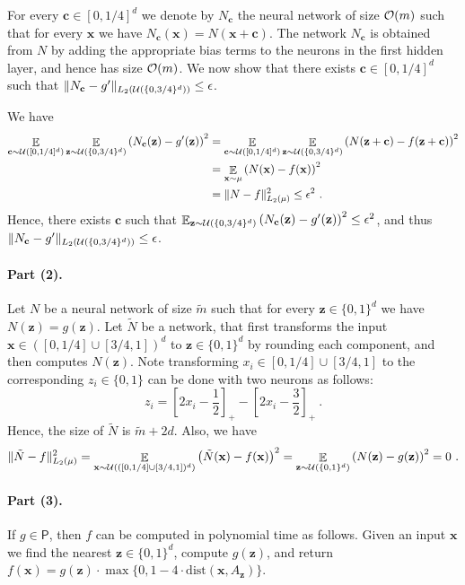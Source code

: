 \documentclass[11pt]{article}
\newcommand{\bx}{\mathbf{x}}
\newcommand{\bz}{\mathbf{z}}
\newcommand{\bc}{\mathbf{c}}
\newcommand{\co}{{\cal O}}
\newcommand{\cu}{{\cal U}}
\DeclareMathOperator*{\E}{\mathbb{E}}
\newcommand{\snorm}[1]{\|#1\|} %
\newcommand{\Ptime}{\textsf{P}}
\begin{document}
For every $\bc \in [0,1/4]^d$ we denote by $N_\bc$ the neural network of size $\co(m)$ such that for every $\bx$ we have $N_\bc(\bx)=N(\bx+\bc)$. The network $N_\bc$ is obtained from $N$ by adding the appropriate bias terms to the neurons in the first hidden layer, and hence has size $\co(m)$. We now show that there exists $\bc \in [0,1/4]^d$ such that 
$\snorm{N_\bc - g'}_{L_2(\cu(\{0,3/4\}^d))} \leq \epsilon$.

We have 
\begin{align*}
	\E_{\bc \sim \cu([0,1/4]^d)} \E_{\bz \sim \cu(\{0,3/4\}^d)} \left(N_\bc(\bz)-g'(\bz)\right)^2 
	&= \E_{\bc \sim \cu([0,1/4]^d)} \E_{\bz \sim \cu(\{0,3/4\}^d)} \left(N(\bz+\bc)-f(\bz+\bc)\right)^2 
	\\
	&= \E_{\bx \sim \mu} \left(N(\bx)-f(\bx)\right)^2 
	\\
	&=\snorm{N-f}_{L_2(\mu)}^2
	\leq \epsilon^2~.
\end{align*}
Hence, there exists $\bc$ such that 
$\E_{\bz \sim \cu(\{0,3/4\}^d)} \left(N_\bc(\bz)-g'(\bz)\right)^2 \leq \epsilon^2$,
and thus $\snorm{N_\bc - g'}_{L_2(\cu(\{0,3/4\}^d))} \leq \epsilon$.

\paragraph{Part (2).}
Let $N$ be a neural network of size $\tilde{m}$ such that for every $\bz \in \{0,1\}^d$ we have $N(\bz)=g(\bz)$. Let $\tilde{N}$ be a network, that first transforms the input $\bx \in ([0,1/4] \cup [3/4,1])^d$ to $\bz \in \{0,1\}^d$ by rounding each component, and then computes $N(\bz)$.
Note transforming $x_i \in [0,1/4] \cup [3/4,1]$ to the corresponding $z_i \in \{0,1\}$ can be done with two neurons as follows:
\[
z_i	= \left[2x_i-\frac{1}{2}\right]_+ - \left[2x_i-\frac{3}{2}\right]_+~.
\]
Hence, the size of $\tilde{N}$ is $\tilde{m}+2d$. Also, we have
\[
\snorm{\tilde{N}-f}_{L_2(\mu)} ^2
= \E_{\bx \sim \cu(([0,1/4] \cup [3/4,1])^d)}\left(\tilde{N}(\bx)-f(\bx)\right)^2
= \E_{\bz \sim \cu(\{0,1\}^d)}\left(N(\bz) - g(\bz) \right)^2
= 0~.
\]

\paragraph{Part (3).}
If $g \in \Ptime$, then $f$ can be computed in polynomial time as follows. Given an input $\bx$ we find the nearest $\bz \in \{0,1\}^d$, compute $g(\bz)$, and return $f(\bx)= g(\bz) \cdot \max\{0, 1 - 4 \cdot \text{dist}(\bx,A_\bz)\}$.
\end{document}
